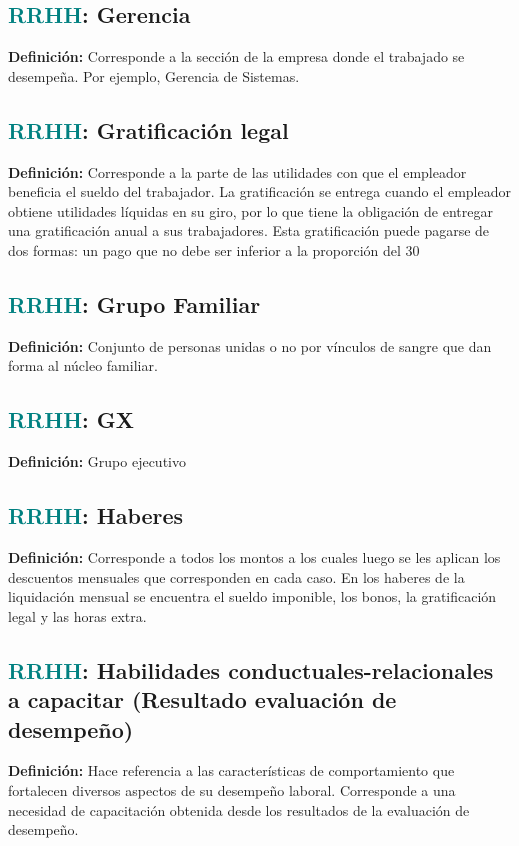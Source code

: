 \documentclass[12pt]{article}
\begin{document}
\subsection{\textcolor{teal}{RRHH}: Gerencia}
\textbf{Definición:} Corresponde a la sección de la empresa donde el trabajado se desempeña. Por ejemplo, Gerencia de Sistemas.
\subsection{\textcolor{teal}{RRHH}: Gratificación legal}
\textbf{Definición:} Corresponde a la parte de las utilidades con que el empleador beneficia el sueldo del trabajador.
La gratificación se entrega cuando el empleador obtiene utilidades líquidas en su giro, por lo que tiene la obligación de entregar una gratificación anual a sus trabajadores. Esta gratificación puede pagarse de dos formas: un pago que no debe ser inferior a la proporción del 30%

\subsection{\textcolor{teal}{RRHH}: Grupo Familiar}
\textbf{Definición:} Conjunto de personas unidas o no por vínculos de sangre que dan forma al núcleo familiar.
\subsection{\textcolor{teal}{RRHH}: GX}
\textbf{Definición:} Grupo ejecutivo
\subsection{\textcolor{teal}{RRHH}: Haberes}
\textbf{Definición:} Corresponde a todos los montos a los cuales luego se les aplican los descuentos mensuales que corresponden en cada caso. En los haberes de la liquidación mensual se encuentra el sueldo imponible, los bonos, la gratificación legal y las horas extra.
\subsection{\textcolor{teal}{RRHH}: Habilidades conductuales-relacionales a capacitar (Resultado evaluación de desempeño)}
\textbf{Definición:} Hace referencia a las características de comportamiento que fortalecen diversos aspectos de su desempeño laboral. Corresponde a una necesidad de capacitación obtenida desde los resultados de la evaluación de desempeño.
\end{document}
